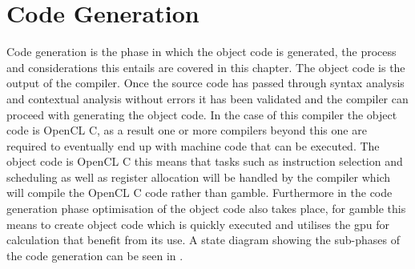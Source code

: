 \chapter{Code Generation}
Code generation is the phase in which the object code is generated, the process and considerations this entails are covered in this chapter.
The object code is the output of the compiler.
Once the source code has passed through syntax analysis and contextual analysis without errors it has been validated and the compiler can proceed with generating the object code.
In the case of this compiler the object code is OpenCL C, as a result one or more compilers beyond this one are required to eventually end up with machine code that can be executed.
The object code is OpenCL C this means that tasks such as instruction selection and scheduling as well as register allocation will be handled by the compiler which will compile the OpenCL C code rather than \gls{gamble}.
Furthermore in the code generation phase optimisation of the object code also takes place, for \gls{gamble} this means to create object code which is quickly executed and utilises the \acrshort{gpu} for calculation that benefit from its use.
A state diagram showing the sub-phases of the code generation can be seen in .


